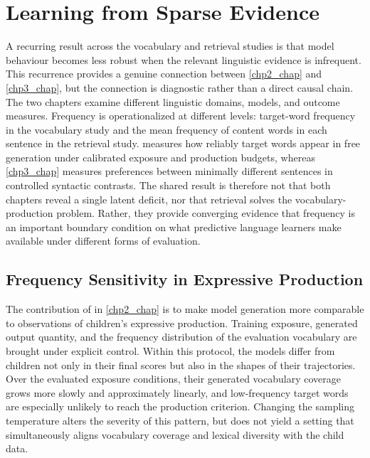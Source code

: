 \section{Learning from Sparse Evidence}
\label{sec:gd_sparse_evidence}

A recurring result across the vocabulary and retrieval studies is that model behaviour becomes less robust when the relevant linguistic evidence is infrequent. This recurrence provides a genuine connection between \cref{chp2_chap} and \cref{chp3_chap}, but the connection is diagnostic rather than a direct causal chain. The two chapters examine different linguistic domains, models, and outcome measures. Frequency is operationalized at different levels: target-word frequency in the vocabulary study and the mean frequency of content words in each sentence in the retrieval study.  measures how reliably target words appear in free generation under calibrated exposure and production budgets, whereas \cref{chp3_chap} measures preferences between minimally different sentences in controlled syntactic contrasts. The shared result is therefore not that both chapters reveal a single latent deficit, nor that retrieval solves the vocabulary-production problem. Rather, they provide converging evidence that frequency is an important boundary condition on what predictive language learners make available under different forms of evaluation.

\subsection{Frequency Sensitivity in Expressive Production}

The contribution of \meCDI{} in \cref{chp2_chap} is to make model generation more comparable to observations of children's expressive production. Training exposure, generated output quantity, and the frequency distribution of the evaluation vocabulary are brought under explicit control. Within this protocol, the models differ from children not only in their final scores but also in the shapes of their trajectories. Over the evaluated exposure conditions, their generated vocabulary coverage grows more slowly and approximately linearly, and low-frequency target words are especially unlikely to reach the production criterion. Changing the sampling temperature alters the severity of this pattern, but does not yield a setting that simultaneously aligns vocabulary coverage and lexical diversity with the child data.

